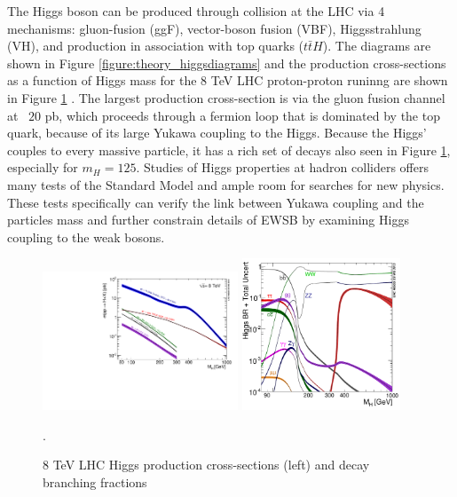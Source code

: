 The Higgs boson can be produced through collision at the LHC
via 4 mechanisms: gluon-fusion (ggF), vector-boson fusion (VBF), 
Higgsstrahlung (VH), and production in association with top quarks ($t\bar{t}H$). The diagrams
are shown in Figure \ref{figure:theory_higgsdiagrams} and the production
cross-sections as a function of Higgs mass for the 8 TeV LHC proton-proton
runinng are shown in Figure \ref{figure:theory_xsec} \cite{Dittmaier:2012vm}. The largest production
cross-section is via the gluon fusion channel at ~$20$ pb, which proceeds
through a fermion loop that is dominated by the top quark, because of its
large Yukawa coupling to the Higgs. Because the Higgs' couples to every massive
particle, it has a rich set of decays also seen in Figure
\ref{figure:theory_xsec}, especially for $m_H=125$.  Studies of Higgs
properties at hadron colliders offers many tests of the Standard Model
and ample room for searches for new physics. These
tests specifically can verify the link between Yukawa coupling and the
particles mass and further constrain details of EWSB by examining Higgs coupling
to the weak bosons. 

\begin{figure}[!t]
\centering 
\includegraphics[width=0.52\textwidth]{figs/Higgs_XS_8TeV_lx.pdf}
\includegraphics[width=0.42\textwidth]{figs/Higgs_BR.pdf}
\caption {8 TeV LHC Higgs production cross-sections (left) and decay branching fractions }.
\label{figure:theory_xsec}
\end{figure}


